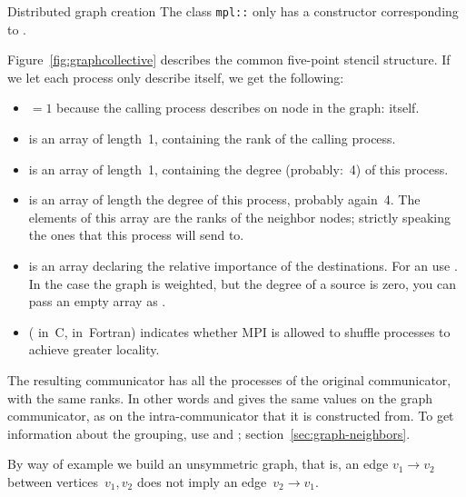 \begin{mplnote}{Distributed graph creation}
  The class \lstinline+mpl::+
  only has a constructor corresponding to .
\end{mplnote}

Figure~\ref{fig:graphcollective} describes the common five-point
stencil structure. If we let each process only describe itself, we get
the following:
\begin{itemize}
\item {}$=1$ because the calling process describes on node
  in the graph: itself.
\item {} is an array of length~1, containing the rank of the
  calling process.
\item {} is an array of length~1, containing the degree
  (probably:~4) of this process.
\item {} is an array of length the degree of this
  process, probably again~4. The elements of this array are the ranks
  of the neighbor nodes; strictly speaking the ones that this process
  will send to.
\item {} is an array declaring the relative importance of the
  destinations. For an  use
  .
  In the case the graph is weighted, but the degree of a source is zero, you can pass
  an empty array as .
\item {} ( in~C,  in~Fortran) indicates
  whether MPI is allowed to shuffle processes to achieve greater locality.
\end{itemize}

The resulting communicator has all the processes of the original
communicator, with the same ranks.
In other words  and 
gives the same values on the graph communicator, as on the intra-communicator
that it is constructed from.
To get information about the grouping,
use 
and ;
section~\ref{sec:graph-neighbors}.

By way of example we build an unsymmetric graph, that is,
an edge $v_1\rightarrow v_2$ between vertices~$v_1,v_2$
does not imply an edge~$v_2\rightarrow v_1$.
%

